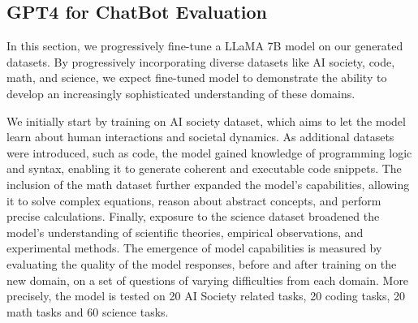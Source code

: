 \begin{table}[h]
  \centering
  \caption{\textbf{Agent Evaluation Results}: Results of the evaluations of the CAMEL agent against \texttt{gpt-3.5-turbo} using both human evaluators and GPT4 consistently show that utilizing a multi-agent cooperative approach is more effective than \texttt{gpt-3.5-turbo}'s single shot solution.}
  \label{agent_eval}

\end{table}


\subsection{GPT4 for ChatBot Evaluation}\label{sec:emergence}

In this section, we progressively fine-tune a LLaMA 7B model on our generated datasets. By progressively incorporating diverse datasets like AI society, code, math, and science, we expect fine-tuned model to demonstrate the ability to develop an increasingly sophisticated understanding of these domains.

We initially start by training on AI society dataset, which aims to let the model learn about human interactions and societal dynamics. As additional datasets were introduced, such as code, the model gained knowledge of programming logic and syntax, enabling it to generate coherent and executable code snippets. The inclusion of the math dataset further expanded the model's capabilities, allowing it to solve complex equations, reason about abstract concepts, and perform precise calculations. Finally, exposure to the science dataset broadened the model's understanding of scientific theories, empirical observations, and experimental methods. The emergence of model capabilities is measured by evaluating the quality of the model responses, before and after training on the new domain, on a set of questions of varying difficulties from each domain. More precisely, the model is tested on 20 AI Society related tasks, 20 coding tasks, 20 math tasks and 60 science tasks.

